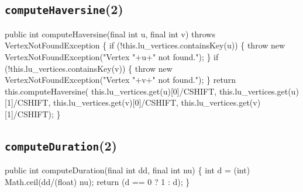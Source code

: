 \documentclass{article}
\def\nwendcode{\endtrivlist \endgroup}      %
\let\nwdocspar=\par
\begin{document}
\subsection{{\tt{}\protect{}computeHaversine}(2)}
\nwenddocs{}\plusendmoddef
public int computeHaversine(final int u, final int v) throws VertexNotFoundException \{
  if (!this.lu_vertices.containsKey(u)) \{
    throw new VertexNotFoundException("Vertex "+u+" not found.");
  \}
  if (!this.lu_vertices.containsKey(v)) \{
    throw new VertexNotFoundException("Vertex "+v+" not found.");
  \}
  return this.computeHaversine(
    this.lu_vertices.get(u)[0]/CSHIFT, this.lu_vertices.get(u)[1]/CSHIFT,
    this.lu_vertices.get(v)[0]/CSHIFT, this.lu_vertices.get(v)[1]/CSHIFT);
\}
\nwendcode{}\nwdocspar

\subsection{{\tt{}computeDuration}(2)}
\nwenddocs{}\endmoddef{}
public int computeDuration(final int dd, final int nu) \{
  int d = (int) Math.ceil(dd/(float) nu);
  return (d == 0 ? 1 : d);
\}
\nwendcode{}\nwdocspar
\end{document}
